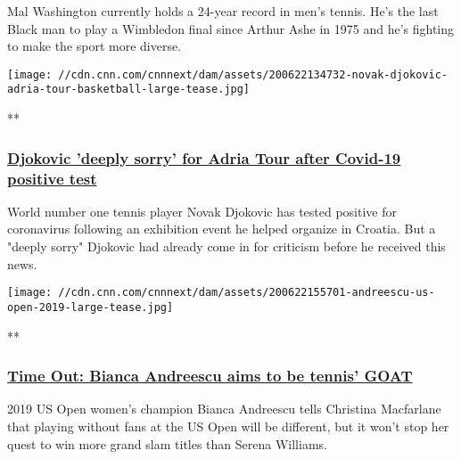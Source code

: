Mal Washington currently holds a 24-year record in men's tennis. He's
the last Black man to play a Wimbledon final since Arthur Ashe in 1975
and he's fighting to make the sport more diverse.

\href{/videos/sports/2020/06/24/novak-djokovic-coronavirus-positive-test-adria-tour-croatia-criticism-tennis-spt-intl.cnn}{}

\texttt{[image: //cdn.cnn.com/cnnnext/dam/assets/200622134732-novak-djokovic-adria-tour-basketball-large-tease.jpg]}

**

\hypertarget{djokovic-deeply-sorry-for-adria-tour-after-covid-19-positive-test}{%
\subsubsection{\texorpdfstring{\href{/videos/sports/2020/06/24/novak-djokovic-coronavirus-positive-test-adria-tour-croatia-criticism-tennis-spt-intl.cnn}{Djokovic
'deeply sorry' for Adria Tour after Covid-19 positive
test}}{Djokovic 'deeply sorry' for Adria Tour after Covid-19 positive test}}\label{djokovic-deeply-sorry-for-adria-tour-after-covid-19-positive-test}}

World number one tennis player Novak Djokovic has tested positive for
coronavirus following an exhibition event he helped organize in Croatia.
But a "deeply sorry" Djokovic had already come in for criticism before
he received this news.

\href{/videos/sports/2020/06/23/bianca-andreescu-time-out-us-open-no-fans-serena-williams-more-slams-spt-intl-lon-orig.cnn}{}

\texttt{[image: //cdn.cnn.com/cnnnext/dam/assets/200622155701-andreescu-us-open-2019-large-tease.jpg]}

**

\hypertarget{time-out-bianca-andreescu-aims-to-be-tennis-goat}{%
\subsubsection{\texorpdfstring{\href{/videos/sports/2020/06/23/bianca-andreescu-time-out-us-open-no-fans-serena-williams-more-slams-spt-intl-lon-orig.cnn}{Time
Out: Bianca Andreescu aims to be tennis'
GOAT}}{Time Out: Bianca Andreescu aims to be tennis' GOAT}}\label{time-out-bianca-andreescu-aims-to-be-tennis-goat}}

2019 US Open women's champion Bianca Andreescu tells Christina
Macfarlane that playing without fans at the US Open will be different,
but it won't stop her quest to win more grand slam titles than Serena
Williams.

